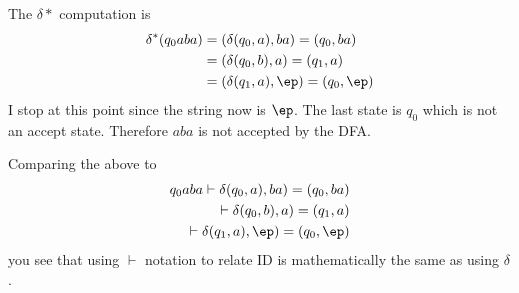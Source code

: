   The $\delta*$ computation is
  \begin{align*}
    \delta^*(q_0 aba)
    &= (\delta(q_0, a), ba) = (q_0, ba) \\
    &= (\delta(q_0, b), a) = (q_1, a) \\
    &= (\delta(q_1, a), \ep) = (q_0, \ep)
  \end{align*}
  I stop at this point since the string now is $\ep$.
  The last state is $q_0$ which is not an accept state.
  Therefore
  $aba$ is not accepted by the DFA.

  Comparing the above to
    \begin{align*}
    q_0 aba
    \vdash \delta(q_0, a), ba) = (q_0, ba) \\ 
    \vdash \delta(q_0, b), a) = (q_1, a) \\
    \vdash \delta(q_1, a), \ep) = (q_0, \ep)
  \end{align*}
    you see that using $\vdash$ notation to relate
    ID is mathematically the same as
    using $\delta$.
